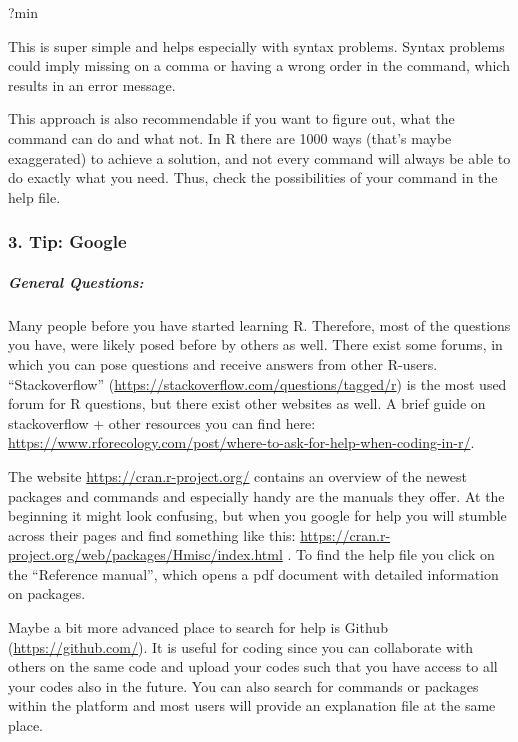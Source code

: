 \documentclass[
]{article}
\newenvironment{Shaded}{\begin{snugshade}}{\end{snugshade}}
\newcommand{\NormalTok}[1]{#1}
\begin{document}
\begin{Shaded}
\begin{Highlighting}[]
\NormalTok{?min}
\end{Highlighting}
\end{Shaded}

This is super simple and helps especially with syntax problems. Syntax
problems could imply missing on a comma or having a wrong order in the
command, which results in an error message.

This approach is also recommendable if you want to figure out, what the
command can do and what not. In R there are 1000 ways (that's maybe
exaggerated) to achieve a solution, and not every command will always be
able to do exactly what you need. Thus, check the possibilities of your
command in the help file.

\hypertarget{tip-google}{%
\subsubsection{3. Tip: Google}\label{tip-google}}

\hypertarget{general-questions}{%
\subparagraph{General Questions:}\label{general-questions}}

Many people before you have started learning R. Therefore, most of the
questions you have, were likely posed before by others as well. There
exist some forums, in which you can pose questions and receive answers
from other R-users. ``Stackoverflow''
(\url{https://stackoverflow.com/questions/tagged/r}) is the most used
forum for R questions, but there exist other websites as well. A brief
guide on stackoverflow + other resources you can find here:
\url{https://www.rforecology.com/post/where-to-ask-for-help-when-coding-in-r/}.

The website \url{https://cran.r-project.org/} contains an overview of
the newest packages and commands and especially handy are the manuals
they offer. At the beginning it might look confusing, but when you
google for help you will stumble across their pages and find something
like this:
\url{https://cran.r-project.org/web/packages/Hmisc/index.html} . To find
the help file you click on the ``Reference manual'', which opens a pdf
document with detailed information on packages.

Maybe a bit more advanced place to search for help is Github
(\url{https://github.com/}). It is useful for coding since you can
collaborate with others on the same code and upload your codes such that
you have access to all your codes also in the future. You can also
search for commands or packages within the platform and most users will
provide an explanation file at the same place.
\end{document}
